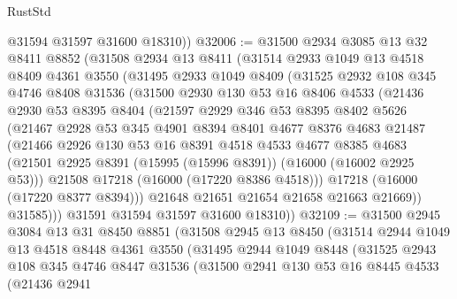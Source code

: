 \begin{lexlean}{RustStd}
\begin{coremodule}
        @31594
        @31597
        @31600
        @18310))
@32006 := @31500
    @2934
    @3085
    @13
    @32
    @8411
    @8852
    (@31508
      @2934
      @13
      @8411
      (@31514
        @2933
        @1049
        @13
        @4518
        @8409
        @4361
        @3550
        (@31495
          @2933
          @1049
          @8409
          (@31525
            @2932
            @108
            @345
            @4746
            @8408
            @31536
            (@31500
              @2930
              @130
              @53
              @16
              @8406
              @4533
              (@21436
                @2930
                @53
                @8395
                @8404
                (@21597
                  @2929
                  @346
                  @53
                  @8395
                  @8402
                  @5626
                  (@21467
                    @2928
                    @53
                    @345
                    @4901
                    @8394
                    @8401
                    @4677
                    @8376
                    @4683
                    @21487
                    (@21466
                      @2926
                      @130
                      @53
                      @16
                      @8391
                      @4518
                      @4533
                      @4677
                      @8385
                      @4683
                      (@21501 @2925 @8391 (@15995 (@15996 @8391)) (@16000 (@16002 @2925 @53)))
                      @21508
                      @17218
                      (@16000 (@17220 @8386 @4518)))
                    @17218
                    (@16000 (@17220 @8377 @8394)))
                  @21648
                  @21651
                  @21654
                  @21658
                  @21663
                  @21669))
              @31585)))
        @31591
        @31594
        @31597
        @31600
        @18310))
@32109 := @31500
    @2945
    @3084
    @13
    @31
    @8450
    @8851
    (@31508
      @2945
      @13
      @8450
      (@31514
        @2944
        @1049
        @13
        @4518
        @8448
        @4361
        @3550
        (@31495
          @2944
          @1049
          @8448
          (@31525
            @2943
            @108
            @345
            @4746
            @8447
            @31536
            (@31500
              @2941
              @130
              @53
              @16
              @8445
              @4533
              (@21436
                @2941

\end{coremodule}
\end{lexlean}
